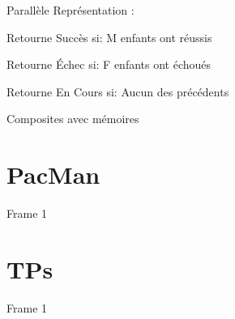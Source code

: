 \documentclass[presentation]{beamer}
\begin{document}
\begin{frame}[label=sec-2-3-3]{\alert{Parallèle}}
Représentation :

Retourne Succès si:
M enfants ont réussis

Retourne Échec si:
F enfants ont échoués

Retourne En Cours si:
Aucun des précédents
\end{frame}

\begin{frame}[label=sec-2-3-4]{Composites avec mémoires}
\end{frame}


\section{PacMan}
\label{sec-3}
\begin{frame}[label=sec-3-0-1]{Frame 1}
\end{frame}


\section{TPs}
\label{sec-4}
\begin{frame}[label=sec-4-0-1]{Frame 1}
\end{frame}
\end{document}
